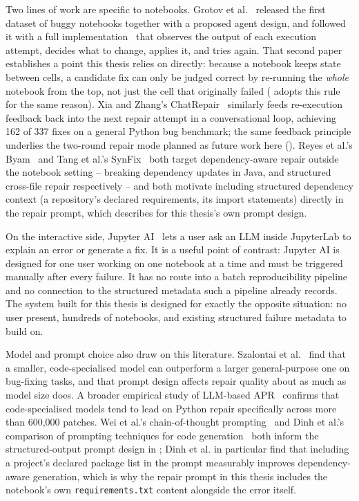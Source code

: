 Two lines of work are specific to notebooks. Grotov et
al.~\cite{grotov2024untangling} released the first dataset of buggy
notebooks together with a proposed agent design, and followed it with a full
implementation~\cite{grotov2024debug} that observes the output of each
execution attempt, decides what to change, applies it, and tries again. That
second paper establishes a point this thesis relies on directly: because a
notebook keeps state between cells, a candidate fix can only be judged
correct by re-running the \emph{whole} notebook from the top, not just the
cell that originally failed ( adopts this rule for
the same reason). Xia and Zhang's ChatRepair~\cite{xia2024chatrepair}
similarly feeds re-execution feedback back into the next repair attempt in a
conversational loop, achieving 162 of 337 fixes on a general Python bug
benchmark; the same feedback principle underlies the two-round repair mode
planned as future work here (). Reyes et
al.'s Byam~\cite{reyes2025byam} and Tang et al.'s
SynFix~\cite{tang2025synfix} both target dependency-aware repair outside the
notebook setting -- breaking dependency updates in Java, and structured
cross-file repair respectively -- and both motivate including structured
dependency context (a repository's declared requirements, its import
statements) directly in the repair prompt, which 
describes for this thesis's own prompt design.

On the interactive side, Jupyter AI~\cite{jupyterai2023} lets a user ask an
LLM inside JupyterLab to explain an error or generate a fix. It is a useful
point of contrast: Jupyter AI is designed for one user working on one
notebook at a time and must be triggered manually after every failure. It
has no route into a batch reproducibility pipeline and no connection to the
structured metadata such a pipeline already records. The system built for
this thesis is designed for exactly the opposite situation: no user present,
hundreds of notebooks, and existing structured failure metadata to build on.

Model and prompt choice also draw on this literature. Szalontai et
al.~\cite{szalontai2024codellama} find that a smaller, code-specialised model
can outperform a larger general-purpose one on bug-fixing tasks, and that
prompt design affects repair quality about as much as model size does.
A broader empirical study of LLM-based APR~\cite{empiricalapr2025} confirms
that code-specialised models tend to lead on Python repair specifically
across more than 600,000 patches. Wei et al.'s chain-of-thought
prompting~\cite{wei2022cot} and Dinh et al.'s comparison of prompting
techniques for code generation~\cite{dinh2024codeprompteval} both inform the
structured-output prompt design in ; Dinh et al. in
particular find that including a project's declared package list in the
prompt measurably improves dependency-aware generation, which is why the
repair prompt in this thesis includes the notebook's own
\texttt{requirements.txt} content alongside the error itself.

